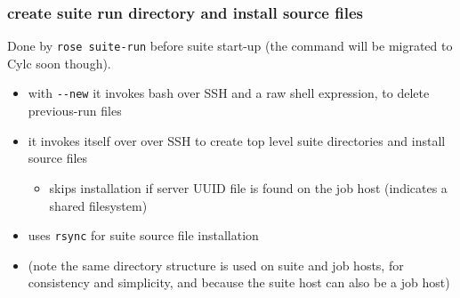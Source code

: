 
\renewcommand*\DTstylecomment{\normalfont\ttfamily\color{comments}}
\renewcommand*\DTstyle{\bf\ttfamily\textcolor{identifiers}}

\subsubsection{create suite run directory and install source files}

Done by \lstinline=rose suite-run= before suite start-up
(the command will be migrated to Cylc soon though).

\begin{itemize}
  \item with \lstinline=--new= it invokes bash over SSH and a raw shell
    expression, to delete previous-run files
  \item it invokes itself over over SSH to create top level suite directories
    and install source files
    \begin{itemize}
      \item skips installation if server UUID file is found on the job host
        (indicates a shared filesystem)
    \end{itemize}
  \item uses \lstinline=rsync= for suite source file installation
  \item (note the same directory structure is used on suite and job hosts, for
    consistency and simplicity, and because the suite host can also be a job host)
\end{itemize}

\lstset{breaklines=true}
\lstset{language=jobhosts}

